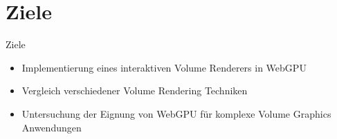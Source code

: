 \section{Ziele}
\begin{frame}{Ziele}
    \begin{itemize}
        \item Implementierung eines interaktiven Volume Renderers in WebGPU
        \item Vergleich verschiedener Volume Rendering Techniken
        \item Untersuchung der Eignung von WebGPU für komplexe Volume Graphics Anwendungen
    \end{itemize}
\end{frame}
